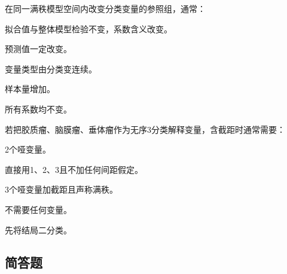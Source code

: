\par\addvspace{6pt}\noindent\begin{minipage}{\linewidth}


在同一满秩模型空间内改变分类变量的参照组，通常：


\begin{choices}

\item 拟合值与整体模型检验不变，系数含义改变。

\item 预测值一定改变。

\item 变量类型由分类变连续。

\item 样本量增加。

\item 所有系数均不变。

\end{choices}

\end{minipage}\par\vspace{4pt}

\par\addvspace{6pt}\noindent\begin{minipage}{\linewidth}


若把胶质瘤、脑膜瘤、垂体瘤作为无序3分类解释变量，含截距时通常需要：


\begin{choices}

\item 2个哑变量。

\item 直接用1、2、3且不加任何间距假定。

\item 3个哑变量加截距且声称满秩。

\item 不需要任何变量。

\item 先将结局二分类。

\end{choices}

\end{minipage}\par\vspace{4pt}

\subsection{简答题}

